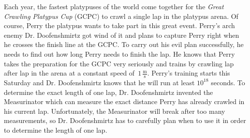 
Each year, the fastest platypuses of the world come together for the \emph{Great Crawling Platypus Cup} (GCPC) to crawl a single lap in the platypus arena.
Of course, Perry the platypus wants to take part in this great event.
Perry's arch enemy Dr. Doofenshmirtz got wind of it and plans to capture Perry right when he crosses the finish line at the GCPC.
To carry out his evil plan successfully, he needs to find out how long Perry needs to finish the lap.
He knows that Perry takes the preparation for the GCPC very seriously and trains by crawling lap after lap in the arena at a constant speed of~$1\,\frac{\text{m}}{\text{s}}$.
Perry's training starts this Saturday and Dr. Doofenshmirtz knows that he will run at least $10^{18}$ seconds.
To determine the exact length of one lap, Dr. Doofenshmirtz invented the Measurinator which can measure the exact distance Perry has already crawled in his current lap.
Unfortunately, the Measurinator will break after too many measurements, so Dr. Doofenshmirtz has to carefully plan when to use it in order to determine the length of one lap.


